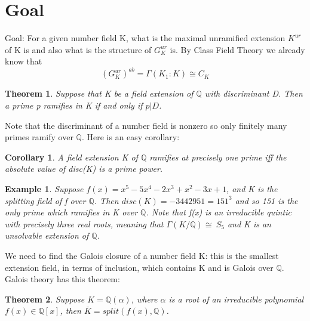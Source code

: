 \documentclass[preprint,12pt,reqno]{elsarticle}
\newtheorem{theorem}{Theorem}
\newtheorem{corollary}{Corollary}[theorem]
\newtheorem{example}{Example}
\begin{document}
\section{Goal}
Goal: For a given number field K, what is the maximal unramified extension $K^{ur}$ of K is and also what is the structure of $G_K^{ur}$ is. By Class Field Theory we already know that 
\begin{equation}
  (G_K^{ur})^{ab} = \Gamma(K_1:K)\cong C_K
\end{equation}
\begin{theorem}
 Suppose that K be a field extension of $\mathbb{Q}$ with discriminant D. Then a prime p
ramifies in K if and only if $p|D$.   
\end{theorem}
Note that the discriminant of a number field is nonzero so only finitely many primes ramify over $\mathbb{Q}$. Here is an easy corollary:
\begin{corollary}
A field extension K of $\mathbb{Q}$ ramifies at precisely one prime iff the absolute value of disc(K) is a prime power.
\end{corollary}
\begin{example}
    Suppose $f(x)=x^5-5x^4-2x^3+x^2-3x+1$, and K is the splitting field of f over $\mathbb{Q}$. Then $disc(K)=-3442951=151^3$ and so 151 is the only prime which ramifies in K over $\mathbb{Q}$. Note that f(x) is an irreducible quintic with precisely three real roots, meaning that $\Gamma(K/\mathbb{Q})\cong\ S_5$ and K is an unsolvable extension of $\mathbb{Q}$.
\end{example}
We need to find the Galois closure of a number field K:  this is the smallest extension field, in terms of inclusion, which contains K and is Galois over $\mathbb{Q}$. Galois theory has this theorem: \begin{theorem}
  Suppose $K=\mathbb{Q}(\alpha)$, where $\alpha$ is a root of an irreducible polynomial $f(x) \in \mathbb{Q}[x]$, then $\bar{K} = split(f(x),\mathbb{Q})$.
\end{theorem}
\end{document}
